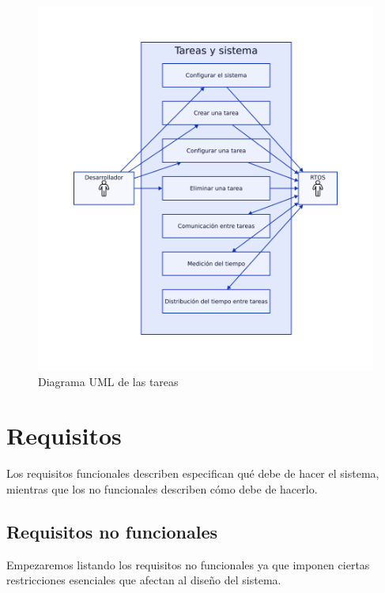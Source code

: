 \begin{figure}[!ht]
\centering
\includegraphics[width=\textwidth]{img/UML1.png}
\caption{Diagrama UML de las tareas}
\label{fig:UML}
\end{figure}

\section{Requisitos}
Los requisitos funcionales describen especifican qué debe de hacer el sistema, mientras que los no funcionales describen cómo debe de hacerlo.

\subsection{Requisitos no funcionales}
Empezaremos listando los requisitos no funcionales ya que imponen ciertas restricciones esenciales que afectan al diseño del sistema.

